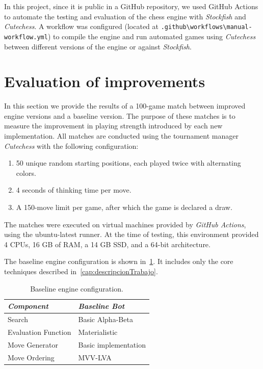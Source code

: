 \vspace{1em}

\parbox{\textwidth}{\noindent In this project, since it is public in a GitHub repository, we used GitHub Actions to automate the testing and evaluation of the chess engine with \textit{Stockfish} and \textit{Cutechess}. A workflow was configured (located at \texttt{.github\textbackslash{}workflows\textbackslash{}manual-workflow.yml}) to compile the engine and run automated games using \textit{Cutechess} between different versions of the engine or against \textit{Stockfish}.}

\section{Evaluation of improvements}

\noindent In this section we provide the results of a 100-game match between improved engine versions and a baseline version. The purpose of these matches is to measure the improvement in playing strength introduced by each new implementation. All matches are conducted using the tournament manager \textit{Cutechess} with the following configuration:

\begin{enumerate}
    \item 50 unique random starting positions, each played twice with alternating colors.
    \item 4 seconds of thinking time per move.
    \item A 150-move limit per game, after which the game is declared a draw.
\end{enumerate}

\vspace{1em}

\parbox{\textwidth}{The matches were executed on virtual machines provided by \textit{GitHub Actions}, using the ubuntu-latest runner. At the time of testing, this environment provided 4 CPUs, 16 GB of RAM, a 14 GB SSD, and a 64-bit architecture.}

\vspace{1em}

\noindent The baseline engine configuration is shown in~\cref{tab:baselineBot}. It includes only the core techniques described in~\cref{cap:descripcionTrabajo}.

\begin{table}[H]
    \centering
    \begin{tabular}{|p{4cm}|p{4cm}|}
    \hline
    \textit{Component}         & \textit{Baseline Bot}     \\ \hline
    Search                     & Basic Alpha-Beta           \\ \hline
    Evaluation Function        & Materialistic        \\ \hline
    Move Generator             & Basic implementation   \\ \hline
    Move Ordering              & MVV-LVA                \\ \hline
    \end{tabular}
    \caption{Baseline engine configuration.}
    \label{tab:baselineBot}
\end{table}

